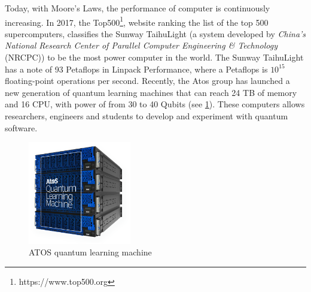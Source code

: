 Today, with Moore's Laws, the performance of computer is continuously increasing. In 2017, the Top500\footnote{https://www.top500.org}, website ranking the list of the top 500 supercomputers, classifies the Sunway TaihuLight (a system developed by \textit{China's National Research Center of Parallel Computer Engineering \& Technology} (NRCPC)) to be the most power computer in the world. The Sunway TaihuLight has a note of 93 Petaflops in Linpack Performance, where a Petaflops is $10^{15}$ floating-point operations per second. Recently, the Atos group has launched a new generation of quantum learning machines that can reach 24 TB of memory and 16 CPU, with power of from 30 to 40 Qubits (see \ref{qlm}). These computers allows researchers, engineers and students to develop and experiment with quantum software.   
\begin{figure}[!h]
\centering 
\includegraphics[width=0.4\textwidth]{images/qlm.png}
\caption{ATOS quantum learning machine}
\label{qlm} 
\end{figure}
